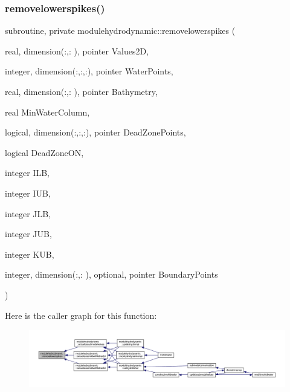 \subsubsection{\texorpdfstring{removelowerspikes()}{removelowerspikes()}}
{\footnotesize\ttfamily subroutine, private modulehydrodynamic\+::removelowerspikes (\begin{DoxyParamCaption}\item[{real, dimension(\+:,\+:  ), pointer}]{Values2D,  }\item[{integer, dimension(\+:,\+:,\+:), pointer}]{Water\+Points,  }\item[{real, dimension(\+:,\+:  ), pointer}]{Bathymetry,  }\item[{real}]{Min\+Water\+Column,  }\item[{logical, dimension(\+:,\+:,\+:), pointer}]{Dead\+Zone\+Points,  }\item[{logical}]{Dead\+Zone\+ON,  }\item[{integer}]{I\+LB,  }\item[{integer}]{I\+UB,  }\item[{integer}]{J\+LB,  }\item[{integer}]{J\+UB,  }\item[{integer}]{K\+UB,  }\item[{integer, dimension(\+:,\+:  ), optional, pointer}]{Boundary\+Points }\end{DoxyParamCaption})\hspace{0.3cm}{\ttfamily [private]}}

Here is the caller graph for this function\+:\nopagebreak
\begin{figure}[H]
\begin{center}
\leavevmode
\includegraphics[width=350pt]{namespacemodulehydrodynamic_aa08df6c812db6e473c13d11473d2c1ad_icgraph}
\end{center}
\end{figure}
\mbox{\label{namespacemodulehydrodynamic_a81fe705d1430f64e261259b13a8b46f8}} 
